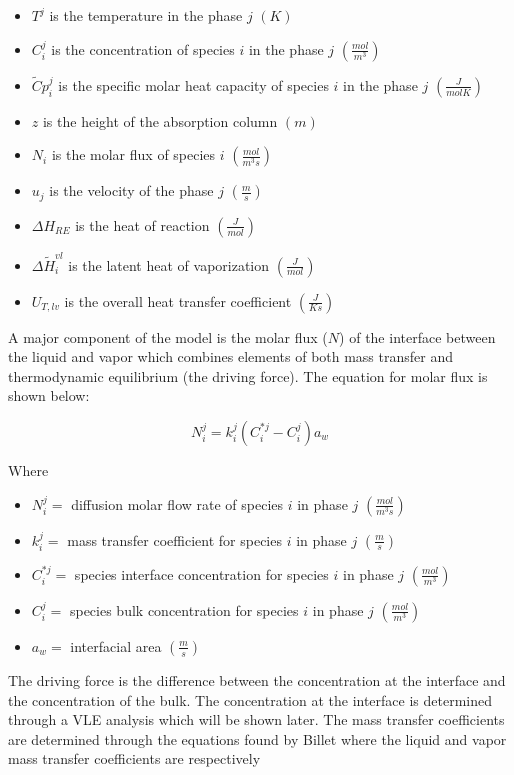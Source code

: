 \begin{itemize}
  \item $T^j$ is the temperature in the phase $j$ $(K)$
  \item $C_i^j$ is the concentration of species $i$ in the phase $j$ $(\frac{mol}{m^3})$
  \item $\tilde{C} p_i^j$ is the specific molar heat capacity of species $i$ in the phase $j$ $(\frac{J}{mol K})$
  \item $z$ is the height of the absorption column $(m)$
  \item $N_i$ is the molar flux of species $i$ $(\frac{mol}{m^3 s})$
  \item $u_j$ is the velocity of the phase $j$ $(\frac{m}{s})$
  \item $\Delta H_{R E}$ is the heat of reaction $(\frac{J}{mol})$
  \item $\Delta \widetilde{H}_i^{v l}$ is the latent heat of vaporization $(\frac{J}{mol})$
  \item $U_{T, l v}$ is the overall heat transfer coefficient $(\frac{J}{K s})$
\end{itemize}

A major component of the model is the molar flux ($N$) of the interface between the liquid and vapor which combines elements of both mass transfer and thermodynamic equilibrium (the driving force). The equation for molar flux is shown below:

\begin{equation}
N_i^j = k_i^j\left(C_i^{* j}-C_i^j\right) a_w
\end{equation}

Where

\begin{itemize}
  \item $N_i^j=$ diffusion molar flow rate of species $i$ in phase $j$ $(\frac{mol}{m^3 s})$
  \item $k_i^j=$ mass transfer coefficient for species $i$ in phase $j$ $(\frac{m}{s})$
  \item $C_i^{* j}=$ species interface concentration for species $i$ in phase $j$ $(\frac{mol}{m^3})$
  \item $C_i^j=$ species bulk concentration for species $i$ in phase $j$ $(\frac{mol}{m^3})$
  \item $a_w=$ interfacial area $(\frac{m}{s})$
\end{itemize}

The driving force is the difference between the concentration at the interface and the concentration of the bulk. The concentration at the interface is determined through a VLE analysis which will be shown later. The mass transfer coefficients are determined through the equations found by Billet  \cite{Billet1999} where the liquid and vapor mass transfer coefficients are respectively

